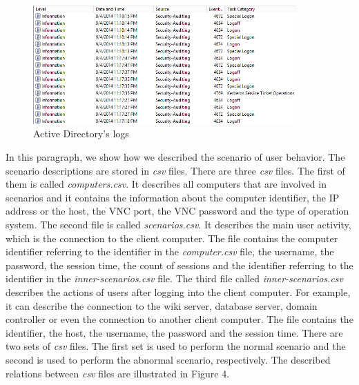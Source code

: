 \begin{figure}[ht!]
\centering
\includegraphics[width=0.9\textwidth]{figures/active_directory_logs_result.png}
\caption{Active Directory's logs}
\label{overflow}
\end{figure}





In this paragraph, we show how we described the scenario of user behavior. The scenario descriptions are stored in \textit{csv} files. There are three \textit{csv} files. The first of them is called \textit{computers.csv}. It describes all computers that are involved in scenarios and it contains the information about the computer identifier, the IP address or the host, the VNC port, the VNC password and the type of operation system.
The second file is called \textit{scenarios.csv}. It describes the main user activity, which is the connection to the client computer. The file contains the computer identifier referring to the identifier in the \textit{computer.csv} file, the username, the password, the session time, the count of sessions and the identifier referring to the identifier in the \textit{inner-scenarios.csv} file. The third file called \textit{inner-scenarios.csv} describes the actions of users after logging into the client computer. For example, it can describe the connection to the wiki server, database server, domain controller or even the connection to another client computer. The file contains the identifier, the host, the username, the password and the session time. There are two sets of \textit{csv} files. The first set is used to perform the normal scenario and the second is used to perform the abnormal scenario, respectively. The described relations between \textit{csv} files are illustrated in Figure 4.
 	
